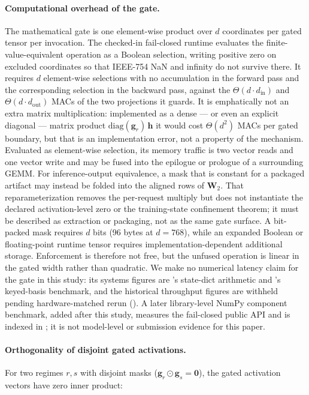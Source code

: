 \documentclass[11pt,a4paper]{article}
\newcommand{\bh}{\mathbf{h}}
\newcommand{\bW}{\mathbf{W}}
\newcommand{\bg}{\mathbf{g}}
\begin{document}
\paragraph{Computational overhead of the gate.}
\label{sec:gate-overhead}
The mathematical gate is one element-wise product over $d$ coordinates per
gated tensor per invocation.  The checked-in fail-closed runtime evaluates the
finite-value-equivalent operation as a Boolean selection, writing positive zero
on excluded coordinates so that IEEE-754 NaN and infinity do not survive there.
It requires $d$ element-wise selections with no accumulation in the forward
pass and the corresponding selection in the backward pass, against
the $\Theta(d\cdot d_{\text{in}})$ and $\Theta(d\cdot d_{\text{out}})$
MACs of the two projections it guards.  It is emphatically not an
extra matrix multiplication: implemented as a dense --- or even an
explicit diagonal --- matrix product $\mathrm{diag}(\bg_r)\,\bh$ it
would cost $\Theta(d^2)$ MACs per gated boundary, but that is an
implementation error, not a property of the mechanism.  Evaluated as
element-wise selection, its memory traffic is two vector reads and one vector
write and may be
fused into the epilogue or prologue of a surrounding GEMM.  For
inference-output equivalence, a mask that is constant for a packaged
artifact may instead be folded into the aligned rows of $\bW_2$.
That reparameterization removes the per-request multiply but does not
instantiate the declared activation-level zero or the training-state
confinement theorem; it must be described as extraction or packaging,
not as the same gate surface.  A bit-packed mask requires $d$ bits
(96 bytes at $d{=}768$), while an expanded Boolean or floating-point
runtime tensor requires implementation-dependent additional storage.
Enforcement is therefore not free, but the unfused operation is linear
in the gated width rather than quadratic.  We make no numerical latency claim for the
gate in this study: its systems figures are
's state-dict arithmetic and
's keyed-basis benchmark, and the
historical throughput figures are withheld pending hardware-matched
rerun ().  A later library-level NumPy component
benchmark, added after this study, measures the fail-closed public API and is
indexed in ; it is not model-level or submission
evidence for this paper.

\paragraph{Orthogonality of disjoint gated activations.}
For two regimes $r,s$ with disjoint masks
($\bg_r \odot \bg_s = \mathbf{0}$), the gated activation vectors
have zero inner product:
\end{document}
